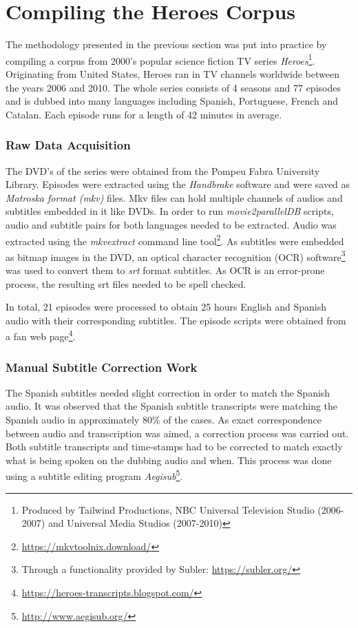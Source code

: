 \section{Compiling the Heroes Corpus}
\label{corpusWorks:heroes}
The methodology presented in the previous section was put into practice by compiling a corpus from 2000's popular science fiction TV series \textit{Heroes}\footnote{Produced by Tailwind Productions, NBC Universal Television Studio (2006-2007) and Universal Media Studios (2007-2010)}. Originating from United States, Heroes ran in TV channels worldwide between the years 2006 and 2010. The whole series consists of 4 seasons and 77 episodes and is dubbed into many languages including Spanish, Portuguese, French and Catalan. Each episode runs for a length of 42 minutes in average. 

\subsubsection*{Raw Data Acquisition}
The DVD's of the series were obtained from the Pompeu Fabra University Library. Episodes were extracted using the \textit{Handbrake} software and were saved as \textit{Matroska format (mkv)} files. Mkv files can hold multiple channels of audios and subtitles embedded in it like DVDs. In order to run \textit{movie2parallelDB} scripts, audio and subtitle pairs for both languages needed to be extracted. Audio was extracted using the \textit{mkvextract} command line tool\footnote{\url{https://mkvtoolnix.download/}}. As subtitles were embedded as bitmap images in the DVD, an optical character recognition (OCR) software\footnote{Through a functionality provided by Subler: \url{https://subler.org/}} was used to convert them to \textit{srt} format subtitles. As OCR is an error-prone process, the resulting srt files needed to be spell checked. 

In total, 21 episodes were processed to obtain 25 hours English and Spanish audio with their corresponding subtitles. The episode scripts were obtained from a fan web page\footnote{\url{https://heroes-transcripts.blogspot.com/}}. 

\subsubsection*{Manual Subtitle Correction Work}
The Spanish subtitles needed slight correction in order to match the Spanish audio. It was observed that the Spanish subtitle transcripts were matching the Spanish audio in approximately 80\% of the cases. As exact correspondence between audio and transcription was aimed, a correction process was carried out. Both subtitle transcripts and time-stamps had to be corrected to match exactly what is being spoken on the dubbing audio and when. This process was done using a subtitle editing program \textit{Aegisub}\footnote{\url{http://www.aegisub.org/}}. 

